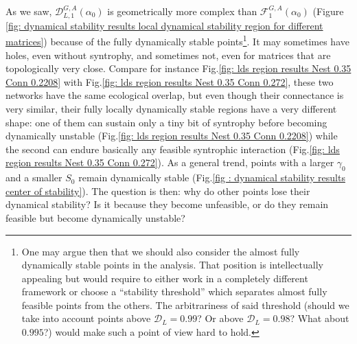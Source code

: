 \documentclass[12pt, titlepage]{report}
\begin{document}
As we saw, $\mathcal{D}_{L,1}^{G,A}\left(\alpha_0\right)$ is geometrically more complex than $\mathcal{F}_{1}^{G,A}\left(\alpha_0\right)$ (Figure \ref{fig: dynamical stability results local dynamical stability region for different matrices}) because of the  fully dynamically stable points\footnote{One may argue then that we should also consider the {almost} fully dynamically stable points in the analysis. That position is intellectually appealing but would require to either work in a completely different framework or choose a ``stability threshold'' which separates almost fully feasible points from the others. The arbitrariness of said threshold (should we take into account points above $\mathcal{D}_L=0.99$? Or above $\mathcal{D}_L=0.98$? What about $0.995$?) would make such a point of view hard to hold.}.
 It may sometimes have holes, even without syntrophy, and sometimes not, even for matrices that are topologically very close. Compare for instance Fig.\ref{fig: lds region results Nest 0.35 Conn 0.2208} with Fig.\ref{fig: lds region results Nest 0.35 Conn 0.272}, these two networks have the same ecological overlap, but even though their connectance is very similar, their fully locally dynamically stable regions have a very different shape: one of them can sustain only a tiny bit of syntrophy before becoming dynamically unstable (Fig.\ref{fig: lds region results Nest 0.35 Conn 0.2208}) while the second can endure basically any feasible syntrophic interaction (Fig.\ref{fig: lds region results Nest 0.35 Conn 0.272}). As a general trend, points with a larger $\gamma_0$ and a smaller $S_0$ remain dynamically stable (Fig.\ref{fig : dynamical stability results center of stability}). The question is then: why do other points lose their dynamical stability? Is it because they become unfeasible, or do they remain feasible but become dynamically unstable?
\end{document}
